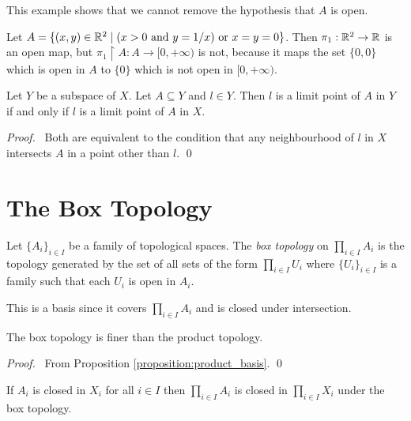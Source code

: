 \begin{example}
    This example shows that we cannot remove the hypothesis that $A$ is open.

    Let $A = \{ (x,y) \in \mathbb{R}^2 \mid (x > 0 \text{ and } y = 1/x) \text{ or } x=y=0 \}$.
    Then $\pi_1 : \mathbb{R}^2 \rightarrow \mathbb{R}$ is an open map, but $\pi_1 \restriction A : A \rightarrow [0, + \infty)$
    is not, because it maps the set $\{ 0,0 \}$ which is open in $A$ to $\{0\}$ which is not open in $[0,+\infty)$.
\end{example}

\begin{proposition}
    \label{proposition:limit_point_subspace}
    Let $Y$ be a subspace of $X$. Let $A \subseteq Y$ and $l \in Y$. Then $l$ is a limit point
    of $A$ in $Y$ if and only if $l$ is a limit point of $A$ in $X$.
\end{proposition}

\begin{proof}
    \pf\ Both are equivalent to the condition that any neighbourhood of $l$ in $X$ intersects $A$ in a point other than $l$. \qed
\end{proof}
\section{The Box Topology}

\begin{definition}
    Let $\{ A_i \}_{i \in I}$ be a family of topological spaces. The \emph{box topology} on $\prod_{i \in I} A_i$ is the topology generated by the set of all sets
    of the form $\prod_{i \in I} U_i$ where $\{ U_i \}_{i \in I}$ is a family such that each $U_i$ is open in $A_i$.
\end{definition}

This is a basis since it covers $\prod_{i \in I} A_i$ and is closed under intersection.

\begin{proposition}
    The box topology is finer than the product topology.
\end{proposition}

\begin{proof}
    \pf\ From Proposition \ref{proposition:product_basis}. \qed
\end{proof}

\begin{corollary}
    \label{corollary:closed_box}
        If $A_i$ is closed in $X_i$ for all $i \in I$ then $\prod_{i \in I} A_i$ is closed in $\prod_{i \in I} X_i$ under the box topology.    
\end{corollary}

